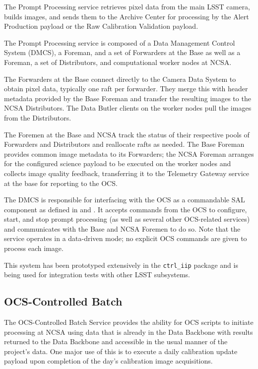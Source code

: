 \documentclass[DM,lsstdraft,toc]{lsstdoc}
\begin{document}
The Prompt Processing service retrieves pixel data from the main LSST camera,
builds images, and sends them to the Archive Center for processing by the Alert Production payload or the Raw Calibration Validation payload.

The Prompt Processing service is composed of a Data Management Control System
(DMCS), a Foreman, and a set of Forwarders at the Base as well as a Foreman, a
set of Distributors, and computational worker nodes at NCSA.

The Forwarders at the Base connect directly to the Camera Data System to obtain
pixel data, typically one raft per forwarder.  They merge this with header
metadata provided by the Base Foreman and transfer the resulting images to the
NCSA Distributors.  The Data Butler clients on the worker nodes pull the images
from the Distributors.

The Foremen at the Base and NCSA track the status of their respective pools of
Forwarders and Distributors and reallocate rafts as needed.  The Base Foreman
provides common image metadata to its Forwarders; the NCSA Foreman arranges for
the configured science payload to be executed on the worker nodes and collects
image quality feedback, transferring it to the Telemetry Gateway service at the
base for reporting to the OCS.

The DMCS is responsible for interfacing with the OCS as a commandable SAL
component as defined in  and .  It accepts
commands from the OCS to configure, start, and stop prompt processing (as well
as several other OCS-related services) and communicates with the Base and NCSA
Foremen to do so.  Note that the service operates in a data-driven mode; no
explicit OCS commands are given to process each image.

This system has been prototyped extensively in the \texttt{ctrl\_iip} package
and is being used for integration tests with other LSST subsystems.

\subsection{OCS-Controlled Batch}\label{ocs-controlled-batch}

The OCS-Controlled Batch Service provides the ability for OCS scripts to
initiate processing at NCSA using data that is already in the Data Backbone
with results returned to the Data Backbone and accessible in the usual manner
of the project’s data.  One major use of this is to execute a daily calibration
update payload upon completion of the day's calibration image acquisitions.
\end{document}
